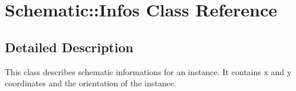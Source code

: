 \hypertarget{class_schematic_1_1_infos}{}\section{Schematic\+:\+:Infos Class Reference}
\label{class_schematic_1_1_infos}


\subsection{Detailed Description}
This class describes schematic informations for an instance. It contains x and y coordinates and the orientation of the instance. 